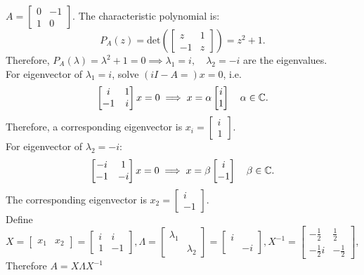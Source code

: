 \documentclass[../main/main.tex]{subfiles}
\begin{document}
\begin{example}
	$A=\begin{bmatrix} 0&-1\\1&0 \end{bmatrix} $. The characteristic polynomial is: \[
		P_A(z)=\text{det}\left( \begin{bmatrix} z&1\\-1&z \end{bmatrix}  \right) =z^2+1
	.\] Therefore, $P_A(\lambda)=\lambda^2+1=0 \implies \lambda_1=i,\quad \lambda_2=-i$ are the eigenvalues. \\For eigenvector of $\lambda_1=i$, solve $\left( i I-A= \right) x=0$, i.e. \[
		\begin{bmatrix} i&1\\-1&i \end{bmatrix} x=0\implies x=\alpha\begin{bmatrix} i\\1 \end{bmatrix} \quad \alpha\in \mathbb{C}
	.\] Therefore, a corresponding eigenvector is $x_{i}=\begin{bmatrix} i\\1 \end{bmatrix} $.\\For eigenvector of $\lambda_2=-i$: \[
		\begin{bmatrix} -i&1\\-1&-i \end{bmatrix} x=0\implies x=\beta\begin{bmatrix} i\\-1 \end{bmatrix} \quad\beta\in \mathbb{C}
	.\] The corresponding eigenvector is $x_2=\begin{bmatrix} i\\-1 \end{bmatrix} $.\\ Define $X=\begin{bmatrix} x_1&x_2 \end{bmatrix} =\begin{bmatrix} i&i\\1&-1 \end{bmatrix},\Lambda=\begin{bmatrix} \lambda_1&\\&\lambda_2 \end{bmatrix} =\begin{bmatrix} i&\\&-i \end{bmatrix},X^{-1}=\begin{bmatrix} -\frac{1}{2}&\frac{1}{2}\\-\frac{1}{2}i&-\frac{1}{2} \end{bmatrix} $,\\Therefore $A=X\Lambda X^{-1}$ \[
\]
\end{example}
\end{document}
